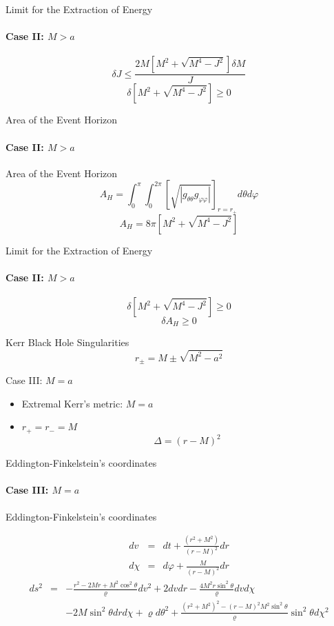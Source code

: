 \documentclass{beamer}
\begin{document}
\begin{darkframes}
        \begin{frame}{Limit for the Extraction of Energy}
       	\framesubtitle{Case II: $M>a$}
        $$\delta J\leq\frac{2M\left[M^{2}+\sqrt{M^{4}-J^{2}}\right]\delta M}{J}$$
        \pause
        $$\delta\left[M^{2}+\sqrt{M^{4}-J^{2}}\right]\geq0$$
        \end{frame}
        
        \begin{frame}{Area of the Event Horizon}
       	\framesubtitle{Case II: $M>a$}
        Area of the Event Horizon
      	$$A_H = \int_{0}^{\pi}\int_{0}^{2\pi} \left[\sqrt{\left|g_{\theta\theta}g_{\varphi\varphi}\right|} \right]_{r = r_{+}}d\theta d\varphi$$
        \pause
        $$A_H = 8\pi\left[M^{2}+\sqrt{M^{4}-J^{2}}\right]$$
        \end{frame}
        
        \begin{frame}{Limit for the Extraction of Energy}
       	\framesubtitle{Case II: $M>a$}
        $$\delta\left[M^{2}+\sqrt{M^{4}-J^{2}}\right]\geq0$$
        \pause
         $$\delta A_H\geq0$$
        \end{frame}
        
        \begin{frame}{Kerr Black Hole Singularities}
            $$r_{\pm}=M\pm\sqrt{M^{2}-a^{2}}$$
    	\end{frame}
       
        \begin{frame}{Case III: $M=a$}
            \begin{itemize}
            \item Extremal Kerr's metric: $M=a$ 
            \pause
            \item $r_{+}=r_{-}=M$ 
			$$\Delta=\left(r-M\right)^{2}$$
            \end{itemize}
        \end{frame}
        
        \begin{frame}{Eddington-Finkelstein's coordinates}
       		\framesubtitle{Case III: $M=a$}
           	Eddington-Finkelstein's coordinates

           	\begin{eqnarray*}
           	dv & = & dt+\frac{\left(r^{2}+M^{2}\right)}{\left(r-M\right)^{2}}dr\\
           	d\chi & = & d\varphi+\frac{M}{\left(r-M\right)^{2}}dr
           	\end{eqnarray*}
          	\pause
          	\footnotesize
          	\begin{eqnarray*}
  			ds^{2} & = & -\frac{r^{2}-2Mr+M^{2}\cos^{2}\theta}{\varrho}dv^{2}+2dvdr-\frac{4M^{2} r \sin^{2}\theta}{\varrho}dvd\chi\\
   				&  & -2M\sin^{2}\theta drd\chi+\varrho d\theta^{2}+\frac{\left(r^{2}+M^{2}\right)^{2}-\left(r-M\right)^{2}M^{2}\sin^{2}\theta}{\varrho}\sin^{2}\theta d\chi^{2}
          	\end{eqnarray*}
        \end{frame}
        

\end{darkframes}
\end{document}
